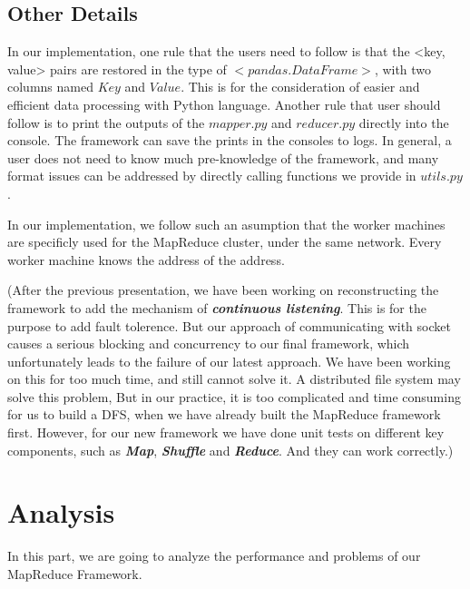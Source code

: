 \documentclass{article}
\begin{document}
	\subsection{Other Details}
		In our implementation, one rule that the users need to follow is that the <key, value> pairs are restored in the type of $<pandas.DataFrame>$, with two columns named $Key$ and $Value$. This is for the consideration of easier and efficient data processing with Python language. Another rule that user should follow is to print the outputs of the $mapper.py$ and $reducer.py$ directly into the console. The framework can save the prints in the consoles to logs. In general, a user does not need to know much pre-knowledge of the framework, and many format issues can be addressed by directly calling functions we provide in $utils.py$.
		
		In our implementation, we follow such an asumption that the worker machines are specificly used for the MapReduce cluster, under the same network. Every worker machine knows the address of the address.
		
(After the previous presentation, we have been working on reconstructing the framework to add the mechanism of \textbf{\textit{continuous listening}}. This is for the purpose to add fault tolerence. But our approach of communicating with socket causes a serious blocking and concurrency to our final framework, which unfortunately leads to the failure of our latest approach. We have been working on this for too much time, and still cannot solve it. A distributed file system may solve this problem, But in our practice, it is too complicated and time consuming for us to build a DFS, when we have already built the MapReduce framework first. However, for our new framework we have done unit tests on different key components, such as \textbf{\textit{Map}}, \textbf{\textit{Shuffle}} and \textbf{\textit{Reduce}}. And they can work correctly.)

\section{Analysis}
In this part, we are going to analyze the performance and problems of our MapReduce Framework.
\end{document}
